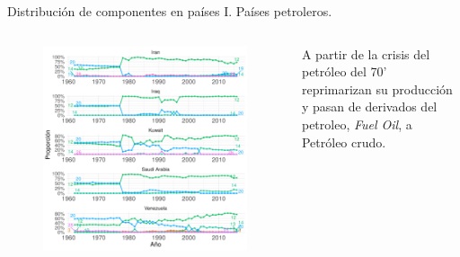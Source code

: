 \documentclass[compress]{beamer}
\begin{document}
\begin{frame}

\small

Distribución de componentes en países I. Países petroleros.

\begin{columns}[c] 
	
	\begin{figure}
		\includegraphics[width=\linewidth]{graficoLDA_k30_IRN_IRQ_KWT_SAU_VEN}
	\end{figure}
	
	
	A partir de la crisis del petróleo del 70' reprimarizan su producción y pasan de derivados del petroleo, \textit{Fuel Oil}, a Petróleo crudo.
	
\end{columns} 

\end{frame}
\end{document}
